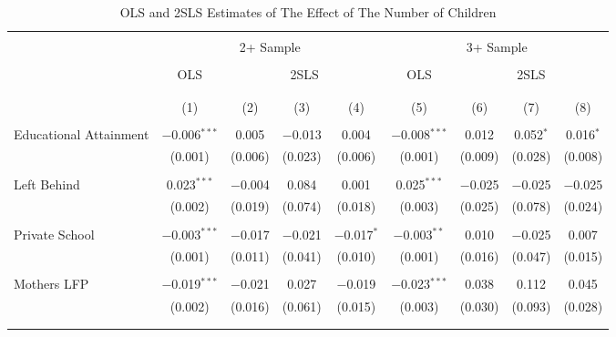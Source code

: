 

\begin{sidewaystable}[!htbp] \centering 
  \caption{OLS and 2SLS Estimates of The Effect of The Number of Children} 
  \label{tab:main-res} 
\begin{threeparttable}
\begin{tabular}{@{\extracolsep{5pt}}lcccccccc} 
\\[-1.8ex]\hline 
\hline \\[-1.8ex] 
 & \multicolumn{4}{c}{2+ Sample} & \multicolumn{4}{c}{3+ Sample} \\
\cline{2-5}  \cline{6-9} \\
 & OLS & \multicolumn{3}{c}{2SLS} & OLS & \multicolumn{3}{c}{2SLS} \\ 
\cline{3-5}  \cline{7-9} \\[-1.8ex]
\\[-1.8ex] & (1) & (2) & (3) & (4) & (5) & (6) & (7) & (8)\\ 
\hline \\[-1.8ex] 
 Educational Attainment & $-$0.006$^{***}$ & 0.005 & $-$0.013 & 0.004 & $-$0.008$^{***}$ & 0.012 & 0.052$^{*}$ & 0.016$^{*}$ \\ 
  & (0.001) & (0.006) & (0.023) & (0.006) & (0.001) & (0.009) & (0.028) & (0.008) \\ 
  & & & & & & & & \\ 
 Left Behind & 0.023$^{***}$ & $-$0.004 & 0.084 & 0.001 & 0.025$^{***}$ & $-$0.025 & $-$0.025 & $-$0.025 \\ 
  & (0.002) & (0.019) & (0.074) & (0.018) & (0.003) & (0.025) & (0.078) & (0.024) \\ 
  & & & & & & & & \\ 
 Private School & $-$0.003$^{***}$ & $-$0.017 & $-$0.021 & $-$0.017$^{*}$ & $-$0.003$^{**}$ & 0.010 & $-$0.025 & 0.007 \\ 
  & (0.001) & (0.011) & (0.041) & (0.010) & (0.001) & (0.016) & (0.047) & (0.015) \\ 
  & & & & & & & & \\ 
 Mothers LFP & $-$0.019$^{***}$ & $-$0.021 & 0.027 & $-$0.019 & $-$0.023$^{***}$ & 0.038 & 0.112 & 0.045 \\ 
  & (0.002) & (0.016) & (0.061) & (0.015) & (0.003) & (0.030) & (0.093) & (0.028) \\ 
  & & & & & & & & \\ 
\hline \\[-1.8ex] 

\end{tabular}
\end{threeparttable}
\end{sidewaystable}
